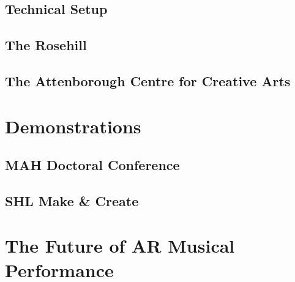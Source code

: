 \subsection{Technical Setup} \label{sec: polygons-performances-setup}
\subsection{The Rosehill} \label{sec: polygons-performances-rosehill}
\subsection{The Attenborough Centre for Creative Arts} \label{sec: polygons-performances-acca}



\section{Demonstrations} \label{sec: polygons-demonstrations}
\subsection{MAH Doctoral Conference} \label{sec: polygons-demonstrations-mah}
\subsection{SHL Make \& Create} \label{sec: polygons-demonstrations-shl}



\section{The Future of AR Musical Performance}